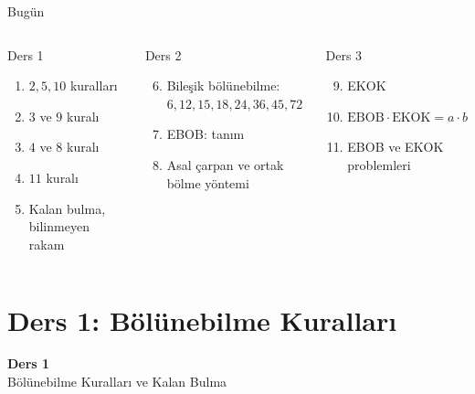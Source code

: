 \documentclass[aspectratio=169,11pt,handout]{beamer}
\begin{document}
\begin{frame}{Bugün}
\begin{columns}[t]
\begin{block}{Ders 1}
\begin{enumerate}
\item \(2,5,10\) kuralları
\item \(3\) ve \(9\) kuralı
\item \(4\) ve \(8\) kuralı
\item \(11\) kuralı
\item Kalan bulma, bilinmeyen rakam
\end{enumerate}
\end{block}
\begin{block}{Ders 2}
\begin{enumerate}\setcounter{enumi}{5}
\item Bileşik bölünebilme: \(6,12,15,18,24,36,45,72\)
\item EBOB: tanım
\item Asal çarpan ve ortak bölme yöntemi
\end{enumerate}
\end{block}
\begin{block}{Ders 3}
\begin{enumerate}\setcounter{enumi}{8}
\item EKOK
\item \(\text{EBOB}\cdot\text{EKOK}=a\cdot b\)
\item EBOB ve EKOK problemleri
\end{enumerate}
\end{block}
\end{columns}
\end{frame}

\section{Ders 1: Bölünebilme Kuralları}
\begin{frame}
\centering\Large\color{anamavi}\textbf{Ders 1}\\[6pt]\normalsize Bölünebilme Kuralları ve Kalan Bulma
\end{frame}
\end{document}
